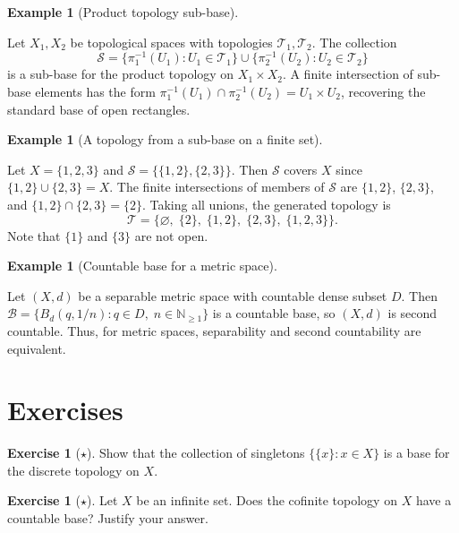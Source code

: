 \documentclass[11pt,a4paper,twoside]{book}
\theoremstyle{remark}
\theoremstyle{definition}
\newtheorem{exampleplain}[theorem]{Example}
\newtheorem{exerciseplain}[theorem]{Exercise}
\theoremstyle{definition}
\newenvironment{example}[1][]{%
  \begin{exampleplain}[#1]\itshape
}{%
  \end{exampleplain}
}
\newenvironment{exercise}[1][]{%
  \begin{exerciseplain}[#1]
}{%
  \end{exerciseplain}
}
\begin{document}
\begin{example}[Product topology sub-base]
\label{ex:product-subbase}
Let $X_1,X_2$ be topological spaces with topologies $\mathscr{T}_1,\mathscr{T}_2$.
The collection
\[
    \mathscr{S}
    = \{\pi_1^{-1}(U_1) : U_1\in\mathscr{T}_1\}
      \cup
      \{\pi_2^{-1}(U_2) : U_2\in\mathscr{T}_2\}
\]
is a sub-base for the product topology on $X_1\times X_2$.  A finite
intersection of sub-base elements has the form
$\pi_1^{-1}(U_1)\cap\pi_2^{-1}(U_2)=U_1\times U_2$, recovering the standard
base of open rectangles.
\end{example}

\begin{example}[A topology from a sub-base on a finite set]
\label{ex:finite-subbase}
Let $X=\{1,2,3\}$ and $\mathscr{S}=\bigl\{\{1,2\},\{2,3\}\bigr\}$.  Then
$\mathscr{S}$ covers $X$ since $\{1,2\}\cup\{2,3\}=X$.  The finite
intersections of members of $\mathscr{S}$ are $\{1,2\}$, $\{2,3\}$, and
$\{1,2\}\cap\{2,3\}=\{2\}$.  Taking all unions, the generated topology is
\[
    \mathscr{T}
    = \bigl\{\varnothing,\;\{2\},\;\{1,2\},\;\{2,3\},\;\{1,2,3\}\bigr\}.
\]
Note that $\{1\}$ and $\{3\}$ are not open.
\end{example}

\begin{example}[Countable base for a metric space]
\label{ex:countable-base-metric}
Let $(X,d)$ be a separable metric space with countable dense subset $D$.  Then
$\mathscr{B}=\{B_d(q,1/n) : q\in D,\;n\in\mathbb{N}_{\ge 1}\}$ is a
countable base, so $(X,d)$ is second countable.  Thus, for metric spaces,
separability and second countability are equivalent.
\end{example}

\section{Exercises}
\label{sec:bases-exercises}

\begin{exercise}[$\star$]
\label{exer:base-discrete}
Show that the collection of singletons $\bigl\{\{x\}:x\in X\bigr\}$ is a base
for the discrete topology on $X$.
\end{exercise}

\begin{exercise}[$\star$]
\label{exer:base-cofinite}
Let $X$ be an infinite set.  Does the cofinite topology on $X$ have a countable
base?  Justify your answer.
\end{exercise}
\end{document}
